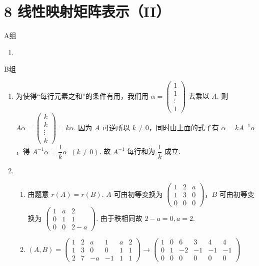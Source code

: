 \section*{8 线性映射矩阵表示（II）}

\vspace{2ex}

\centerline{\heiti A组}
\begin{enumerate}
    \item
\end{enumerate}

\centerline{\heiti B组}
\begin{enumerate}
    \item 为使得``每行元素之和''的条件有用，我们用 $\alpha=\begin{pmatrix}1 \\ 1 \\ \vdots \\ 1\end{pmatrix}$ 去乘以 $A$. 则 $A\alpha=\begin{pmatrix}k \\ k \\ \vdots \\ k\end{pmatrix}=k\alpha$. 因为 $A$ 可逆所以 $k\neq 0$，同时由上面的式子有 $\alpha=kA^{-1}\alpha$，得 $A^{-1}\alpha=\dfrac{1}{k}\alpha\enspace(k\neq 0)$. 故 $A^{-1}$ 每行和为 $\dfrac{1}{k}$ 成立.

    \item \begin{enumerate}
              \item 由题意 $r(A)=r(B)$. $A$ 可由初等变换为 $\begin{pmatrix}1 & 2 & a \\ 1 & 3 & 0 \\ 0 & 0 & 0\end{pmatrix}$，$B$ 可由初等变换为 $\begin{pmatrix}1 & a & 2 \\ 0 & 1 & 1 \\ 0 & 0 & 2-a\end{pmatrix}$. 由于秩相同故 $2-a=0,a=2$.

              \item $(A,B)=\begin{pmatrix}1 & 2 & a & 1 & a & 2 \\ 1 & 3 & 0 & 0 & 1 & 1 \\ 2 & 7 & -a & -1 & 1 & 1\end{pmatrix}\rightarrow\begin{pmatrix}1 & 0 & 6 & 3 & 4 & 4 \\ 0 & 1 & -2 & -1 & -1 & -1 \\ 0 & 0 & 0 & 0 & 0 & 0\end{pmatrix}$


\end{enumerate}
\end{enumerate}
